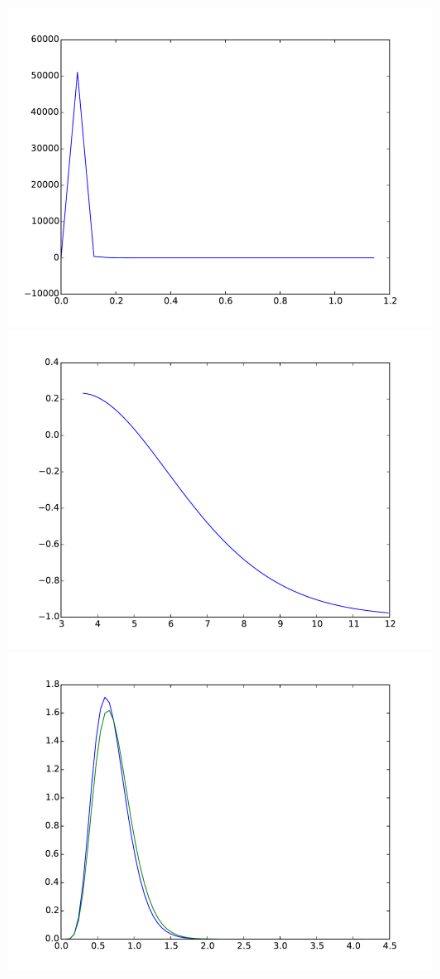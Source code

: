 \documentclass{article}
\begin{document}
\begin{figure}[htb]
\begin{minipage}{.3\textwidth}
		\includegraphics[width=0.97\linewidth]{bootstrap-filter/relative_beginning_simple_4_3.pdf}
	\end{minipage}
	\begin{minipage}{.3\textwidth}
		\centering
		\includegraphics[width=0.97\linewidth]{bootstrap-filter/relative_tail_simple_4_3.pdf}
	\end{minipage}
	\begin{minipage}{.3\textwidth}
		\centering
		\includegraphics[width=0.97\linewidth]{bootstrap-filter/global_simple_3_10.pdf}

\end{minipage}
\end{figure}
\end{document}
